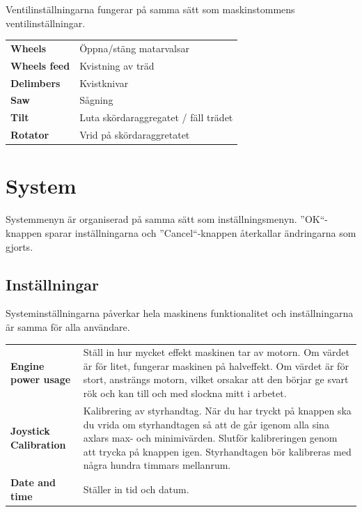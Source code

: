 \documentclass[12pt,a4paper,finnish]{uvmanual}
\begin{document}
Ventilinställningarna fungerar på samma sätt som maskinstommens ventilinställningar.


\begin{tabular}{ L{0.2\textwidth} L{0.66\textwidth} }
\textbf{Wheels} & Öppna/stäng matarvalsar \\
\textbf{Wheels feed} & Kvistning av träd \\
\textbf{Delimbers} & Kvistknivar \\
\textbf{Saw} & Sågning \\
\textbf{Tilt} & Luta skördaraggregatet / fäll trädet  \\
\textbf{Rotator} & Vrid på skördaraggretatet \\
\end{tabular}

\chapter{System}\label{ch:system}

Systemmenyn är organiserad på samma sätt som inställningsmenyn. ''OK``-knappen sparar inställningarna och ''Cancel``-knappen återkallar ändringarna som gjorts.

\section{Inställningar}\label{ch:system_settings}

Systeminställningarna påverkar hela maskinens funktionalitet och inställningarna är samma för alla användare.



\begin{tabular}{ L{0.2\textwidth} L{0.66\textwidth} }
\textbf{Engine power usage} & Ställ in hur mycket effekt maskinen tar av motorn. Om värdet är för litet, fungerar maskinen på halveffekt. Om värdet är för stort, ansträngs motorn, vilket orsakar att den börjar ge svart rök och kan till och med slockna mitt i arbetet. \\
\textbf{Joystick Calibration} & Kalibrering av styrhandtag. När du har tryckt på knappen ska du vrida om styrhandtagen så att de går igenom alla sina axlars max- och minimivärden. Slutför kalibreringen genom att trycka på knappen igen. Styrhandtagen bör kalibreras med några hundra timmars mellanrum.  \\
\textbf{Date and time} & Ställer in tid och datum. \\
\end{tabular}
\end{document}
